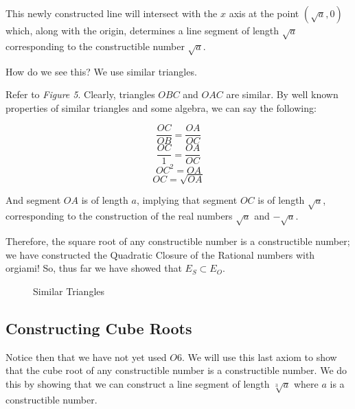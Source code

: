 \documentclass[]{article}
\begin{document}
  This newly constructed line will intersect with the $x$ axis at the point $(\sqrt{a},0)$ which, along with the origin, determines a line segment of length $\sqrt{a}$ corresponding to the constructible number $\sqrt{a}$.
  
  How do we see this? We use similar triangles.
  
  Refer to \emph{Figure 5}. Clearly, triangles $OBC$ and $OAC$ are similar. By well known properties of similar triangles and some algebra, we can say the following:
  
  \[\frac{OC}{OB} = \frac{OA}{OC}\]
  \[\frac{OC}{1} = \frac{OA}{OC}\]
  \[OC^2 = OA\]
  \[OC = \sqrt{OA}\]
  
  And segment $OA$ is of length $a$, implying that segment $OC$ is of length $\sqrt{a}$, corresponding to the construction of the real numbers $\sqrt{a}$ and $-\sqrt{a}$.
  
  Therefore, the square root of any constructible number is a constructible number; we have constructed the Quadratic Closure of the Rational numbers with orgiami! So, thus far we have showed that $E_S \subset E_O$.
   \begin{figure}[t]
   	\centering
   	\caption{Similar Triangles} \label{figure 5}
   \end{figure}
   
  \subsection{Constructing Cube Roots}
  Notice then that we have not yet used $O6$. We will use this last axiom to show that the cube root of any constructible number is a constructible number. We do this by showing that we can construct a line segment of length $\sqrt[3]{a}$ where $a$ is a constructible number.
  
\end{document}
